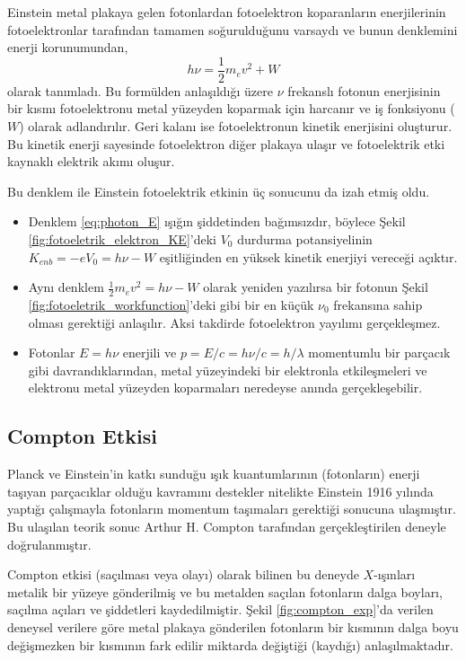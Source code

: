 \documentclass[a4paper,12pt, twoside]{article}
\begin{document}
Einstein metal plakaya gelen fotonlardan fotoelektron koparanların enerjilerinin fotoelektronlar tarafından tamamen soğurulduğunu varsaydı ve bunun denklemini enerji korunumundan,
\begin{equation}
\label{eq:photon_E}
h\nu = \frac{1}{2}m_e v^2 + W
\end{equation}
olarak tanımladı. Bu formülden anlaşıldığı üzere $\nu$ frekanslı fotonun enerjisinin bir kısmı fotoelektronu metal yüzeyden koparmak için harcanır ve iş fonksiyonu ($W$) olarak adlandırılır. Geri kalanı ise fotoelektronun kinetik enerjisini oluşturur. Bu kinetik enerji sayesinde fotoelektron diğer plakaya ulaşır ve fotoelektrik etki kaynaklı elektrik akımı oluşur.

Bu denklem ile Einstein fotoelektrik etkinin üç sonucunu da izah etmiş oldu.

\begin{itemize}
\item Denklem \ref{eq:photon_E} ışığın şiddetinden bağımsızdır, böylece Şekil \ref{fig:fotoeletrik_elektron_KE}'deki $V_0$ durdurma potansiyelinin $K_{enb}=-eV_0=h\nu - W$ eşitliğinden en yüksek kinetik enerjiyi vereceği açıktır.

\item Aynı denklem $\frac{1}{2}m_e v^2 = h\nu - W$ olarak yeniden yazılırsa bir fotonun Şekil \ref{fig:fotoeletrik_workfunction}'deki gibi bir en küçük $\nu_0$ frekansına sahip olması gerektiği anlaşılır. Aksi takdirde fotoelektron yayılımı gerçekleşmez.

\item Fotonlar $E=h\nu$ enerjili ve  $p= E/c = h\nu/c = h/\lambda$ momentumlu bir parçacık gibi davrandıklarından, metal yüzeyindeki bir elektronla etkileşmeleri ve elektronu metal yüzeyden koparmaları neredeyse anında gerçekleşebilir.
\end{itemize}

\subsection{Compton Etkisi}
Planck ve Einstein'in katkı sunduğu ışık kuantumlarının (fotonların) enerji taşıyan parçacıklar olduğu kavramını destekler nitelikte Einstein 1916 yılında yaptığı çalışmayla fotonların momentum taşımaları gerektiği sonucuna ulaşmıştır. Bu ulaşılan teorik sonuc Arthur H. Compton tarafından gerçekleştirilen deneyle doğrulanmıştır.

Compton etkisi (saçılması veya olayı) olarak bilinen bu deneyde $X$-ışınları metalik bir yüzeye gönderilmiş ve bu metalden saçılan fotonların dalga boyları, saçılma açıları ve şiddetleri kaydedilmiştir. Şekil \ref{fig:compton_exp}'da verilen deneysel verilere göre metal plakaya gönderilen fotonların bir kısmının dalga boyu değişmezken bir kısmının fark edilir miktarda değiştiği (kaydığı) anlaşılmaktadır.
\end{document}
